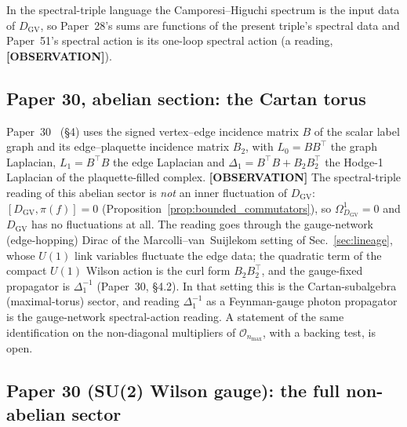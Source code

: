 \documentclass[11pt]{article}
\begin{document}
In the spectral-triple language the Camporesi--Higuchi spectrum is the
input data of $D_{\mathrm{GV}}$, so Paper~28's sums are functions of the
present triple's spectral data and Paper~51's spectral action is its
one-loop spectral action (a reading, \textbf{[OBSERVATION]}).

\subsection{Paper 30, abelian section: the Cartan torus}

Paper~30~\cite{paper30} (\S 4) uses the signed vertex--edge incidence
matrix $B$ of the scalar label graph and its edge--plaquette incidence
matrix $B_2$, with $L_0 = BB^{\top}$ the graph Laplacian,
$L_1 = B^{\top}B$ the edge Laplacian and
$\Delta_1 = B^{\top}B + B_2B_2^{\top}$ the Hodge-1 Laplacian of the
plaquette-filled complex.  \textbf{[OBSERVATION]}
The spectral-triple reading of this abelian sector is \emph{not} an inner fluctuation
of $D_{\mathrm{GV}}$:\ $[D_{\mathrm{GV}}, \pi(f)] = 0$
(Proposition~\ref{prop:bounded_commutators}), so
$\Omega^1_{D_{\mathrm{GV}}} = 0$ and $D_{\mathrm{GV}}$ has no
fluctuations at all.  The reading goes through the gauge-network
(edge-hopping) Dirac of the Marcolli--van~Suijlekom
setting of Sec.~\ref{sec:lineage}, whose $U(1)$ link variables
fluctuate the edge data; the quadratic term of the compact $U(1)$
Wilson action is the curl form $B_2B_2^{\top}$, and the gauge-fixed
propagator is $\Delta_1^{-1}$ (Paper~30, \S 4.2).  In
that setting this is the Cartan-subalgebra (maximal-torus) sector, and
reading $\Delta_1^{-1}$ as a Feynman-gauge photon propagator is the
gauge-network spectral-action reading.  A statement of the same
identification on the non-diagonal multipliers of
$\mathcal{O}_{n_{\max}}$, with a backing test, is open.

\subsection{Paper 30 (SU(2) Wilson gauge): the full non-abelian sector}
\end{document}
